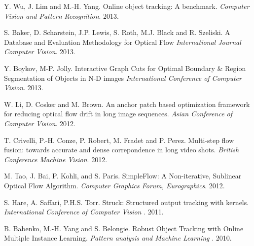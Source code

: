 \begin{thebibliography}{99}
Y. Wu, J. Lim and M.-H. Yang. Online object tracking: A benchmark. {\it Computer Vision and Pattern Recognition}. 2013.

S. Baker, D. Scharstein, J.P. Lewis, S. Roth, M.J. Black and R. Szeliski. A Database and Evaluation Methodology for Optical Flow {\it International Journal Computer Vision}. 2013.

Y. Boykov, M-P. Jolly. Interactive Graph Cuts for Optimal Boundary \& Region Segmentation of Objects in N-D images {\it International Conference of Computer Vision}. 2013.

W. Li, D. Cosker and M. Brown. An anchor patch based optimization framework for reducing optical flow drift in long image sequences. {\it Asian Conference of Computer Vision}. 2012.

T. Crivelli, P.-H. Conze, P. Robert, M. Fradet and P. Perez. Multi-step flow fusion: towards accurate and dense correpondence in long video shots. {\it British Conference Machine Vision}. 2012.

M. Tao, J. Bai, P. Kohli, and S. Paris. SimpleFlow: A Non-iterative, Sublinear Optical Flow Algorithm. {\it Computer Graphics Forum, Eurographics}. 2012.

S. Hare, A. Saffari, P.H.S. Torr. Struck: Structured output tracking with kernels. {\it International Conference of Computer Vision }. 2011.

B. Babenko, M.-H. Yang and S. Belongie. Robust Object Tracking with Online Multiple Instance Learning. {\it Pattern analysis and Machine Learning }. 2010.

\end{thebibliography}
